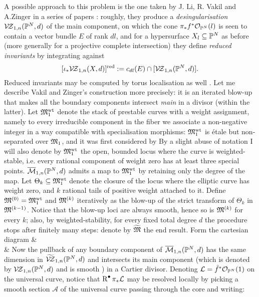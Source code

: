 A possible approach to this problem is the one taken by J. Li, R. Vakil and A.Zinger in a series of papers \cite{zsharp,zstructure,redgone,LZ,lz2,zingerstvsred,VZpreview,VZ}: roughly, they produce a \emph{desingularisation} $\mathcal{V\!Z}_{1,n}(\mathbb P^N,d)$ of the main component, on which the cone $\pi_*f^*\mathcal{O}_{\mathbb P^N}(l)$ is seen to contain a vector bundle $E$ of rank $dl$, and for a hypersurface $X_l\subseteq \mathbb P^N$ as before (more generally for a projective complete intersection) they define \emph{reduced invariants} by integrating against
\[[\iota_* \mathcal{V\!Z}_{1,n}(X,d)]^{\operatorname{red}}:= c_{dl}(E)\cap [\mathcal{V\!Z}_{1,n}(\mathbb P^N,d)].\]
Reduced invariants may be computed by torus localisation as well \cite{Zinger-CYhyp,APopa}. Let me describe Vakil and Zinger's construction more precisely: it is an iterated blow-up that makes all the boundary components intersect \emph{main} in a divisor (within the latter). Let $\mathfrak M_1^{\textrm{wt}}$ denote the stack of prestable curves with a weight assignment, namely to every irreducible component in the fiber we associate a non-negative integer in a way compatible with specialisation morphisms: $\mathfrak M_1^{\textrm{wt}}$ is \'etale but non-separated over $\mathfrak M_1$, and it was first considered by \cite{Costello} By a slight abuse of notation I will also denote by $\mathfrak M_1^{\textrm{wt}}$ the open, bounded locus where the curve is weighted-stable, i.e. every rational component of weight zero has at least three special points. $\overline{\mathcal{M}}_{1,n}(\mathbb P^N,d)$ admits a map to $\mathfrak M_1^{\textrm{wt}}$ by retaining only the degree of the map. Let $\Theta_k\subseteq \mathfrak M_1^{\textrm{wt}}$ denote the closure of the locus where the elliptic curve has weight zero, and $k$ rational tails of positive weight attached to it. Define $\mathfrak M^{(0)}=\mathfrak M_1^{\textrm{wt}}$ and $\mathfrak M^{(k)}$ iteratively as the blow-up of the strict transform of $\Theta_k$ in $\mathfrak M^{(k-1)}$. Notice that the blow-up loci are always smooth, hence so is $\mathfrak M^{(k)}$ for every $k$; also, by weighted-stability, for every fixed total degree $d$ the procedure stops after finitely many steps: denote by $\widetilde{\mathfrak M}$ the end result. Form the cartesian diagram
\bcd
{}\ar[d]\ar[r] & \ar[d] \\
\widetilde{\MM}\ar[r] & \Mwt
\ecd
Now the pullback of any boundary component of $\overline{\mathcal{M}}_{1,n}(\mathbb P^N,d)$ has the same dimension in $\widetilde{\mathcal{V\!Z}}_{1,n}(\mathbb P^N,d)$ and intersects its main component (which is denoted by $\mathcal{V\!Z}_{1,n}(\mathbb P^N,d)$ and is smooth \cite[Theorem 1.1(1)]{VZ}\cite[Theorem 2.9]{HL}) in a Cartier divisor. Denoting $\mathcal L=\tilde f^*\mathcal{O}_{\mathbb P^N}(1)$ on the universal curve, notice that $\operatorname{R}^{\bullet}\pi_*\mathcal L$ may be resolved locally by picking a smooth section $\mathcal A$ of the universal curve passing through the core and writing:
